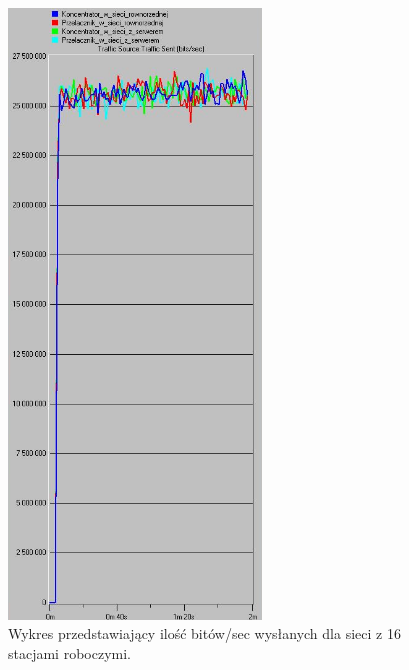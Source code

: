 \documentclass{article}
\begin{document}
\begin{figure}[H]
  \centering
  \includegraphics[width=0.60\textwidth]{screens/16_sent.png}
 \caption{Wykres przedstawiający ilość bitów/sec wysłanych dla sieci z 16 stacjami roboczymi.}
 \label{fig:2stacjes}
\end{figure}
\end{document}
